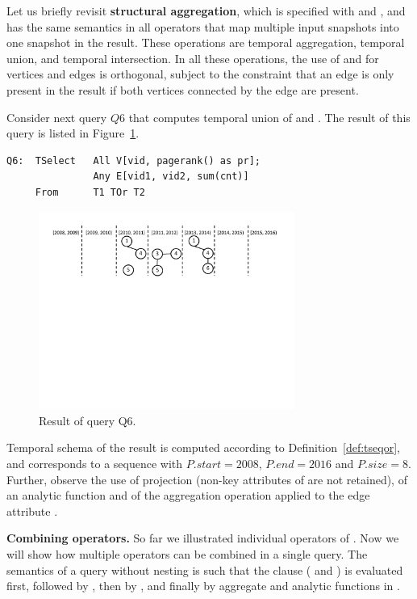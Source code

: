 Let us briefly revisit {\bf structural aggregation}, which is
specified with  and , and has the same semantics
in all \ql operators that map multiple input snapshots into one
snapshot in the result. These operations are temporal aggregation,
temporal union, and temporal intersection.  In all these operations,
the use of  and  for vertices and edges is
orthogonal, subject to the constraint that an edge is only present
in the result if both vertices connected by the edge are present.

Consider next query $Q6$ that computes temporal union of 
and .  The result of this query is listed in
Figure~\ref{fig:q6}.

\begin{small}
\begin{verbatim}
Q6:  TSelect   All V[vid, pagerank() as pr]; 
               Any E[vid1, vid2, sum(cnt)]
     From      T1 TOr T2
\end{verbatim}
\end{small}

\begin{figure}
\centering
\includegraphics[width=3.3in]{figs/q6.pdf}
\caption{Result of query Q6.}
\label{fig:q6}
\end{figure}

Temporal schema of the result is computed according to
Definition~\ref{def:tseqor}, and corresponds to a sequence with
$P.start = 2008$, $P.end=2016$ and $P.size=8$.  Further, observe the
use of projection (non-key attributes of  are not retained),
of an analytic function  and of the aggregation
operation  applied to the edge attribute .

{\bf Combining operators.}  So far we illustrated individual operators
of \ql.  Now we will show how multiple operators can be combined in a
single query.  The semantics of a \ql query without nesting is such
that the  clause ( and ) is
evaluated first, followed by , then by ,
and finally by aggregate and analytic functions in .

